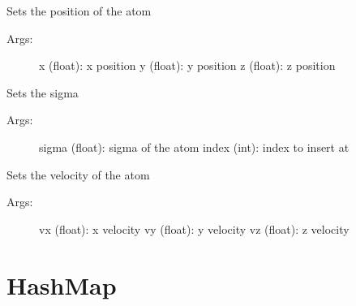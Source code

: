 \documentclass[letterpaper,10pt,english]{sphinxmanual}
\begin{document}
\begin{fulllineitems}
\begin{fulllineitems}
\begin{description}
\end{description}

\end{fulllineitems}



\begin{fulllineitems}
\label{atom:ctools.Atom.Atom.setPosition}
Sets the position of the atom
\begin{description}
\item[{Args:}] \leavevmode
x (float): x position
y (float): y position
z (float): z position

\end{description}

\end{fulllineitems}



\begin{fulllineitems}
\label{atom:ctools.Atom.Atom.setSigma}
Sets the sigma
\begin{description}
\item[{Args:}] \leavevmode
sigma (float): sigma of the atom
index (int): index to insert at

\end{description}

\end{fulllineitems}



\begin{fulllineitems}
\label{atom:ctools.Atom.Atom.setVelocity}
Sets the velocity of the atom
\begin{description}
\item[{Args:}] \leavevmode
vx (float): x velocity
vy (float): y velocity
vz (float): z velocity

\end{description}

\end{fulllineitems}


\end{fulllineitems}



\chapter{HashMap}
\label{hashMap:module-ctools.HashMap}\label{hashMap::doc}\label{hashMap:hashmap}
\end{document}
